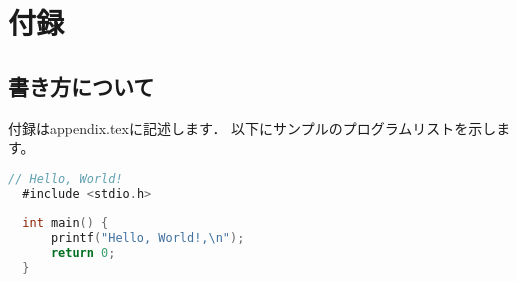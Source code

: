 \appendix%
\chapter{付録}
\section{書き方について}
付録はappendix.texに記述します．
以下にサンプルのプログラムリストを示します。

\begin{lstlisting}[language=C]
  // Hello, World!
  #include <stdio.h>
  
  int main() {
      printf("Hello, World!,\n");
      return 0;
  }
  \end{lstlisting}